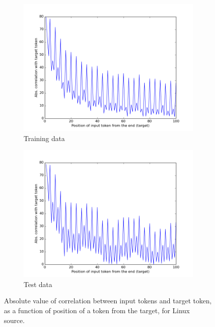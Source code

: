 \begin{figure}[h]
  \centering
  \begin{subfigure}{0.4\textwidth}
    \centering
    \includegraphics[width=\linewidth]{figs/correlation_train.png}
    \caption{Training data}
    \label{fig:correlation-train}
  \end{subfigure}
  \begin{subfigure}{0.4\textwidth}
    \centering
    \includegraphics[width=\linewidth]{figs/correlation_test.png}
    \caption{Test data}
    \label{fig:correlation-test}
  \end{subfigure}
  \caption{Absolute value of correlation between input tokens and target token,
    as a function of position of a token from the target, for Linux source.}
  \label{fig:correlation}
\end{figure}

